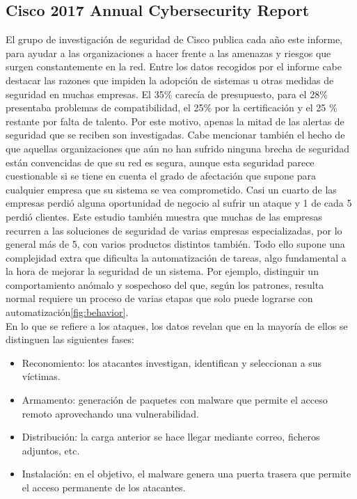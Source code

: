 \subsection{Cisco 2017 Annual Cybersecurity Report}
El grupo de investigación de seguridad de Cisco publica cada año este informe, para ayudar a las organizaciones a hacer frente a las amenazas y riesgos que surgen constantemente en la red. Entre los datos recogidos por el informe cabe destacar las razones que impiden la adopción de sistemas u otras medidas de seguridad en muchas empresas. El 35\% carecía de presupuesto, para el 28\% presentaba problemas de compatibilidad, el 25\% por la certificación y el 25 \% restante por falta de talento. Por este motivo, apenas la mitad de las alertas de seguridad que se reciben son investigadas. Cabe mencionar también el hecho de que aquellas organizaciones que aún no han sufrido ninguna brecha de seguridad están convencidas de que su red es segura, aunque esta seguridad parece cuestionable si se tiene en cuenta el grado de afectación que supone para cualquier empresa que su sistema se vea comprometido. Casi un cuarto de las empresas perdió alguna oportunidad de negocio al sufrir un ataque y 1 de cada 5 perdió clientes. Este estudio también muestra que muchas de las empresas recurren a las soluciones de seguridad de varias empresas especializadas, por lo general más de 5, con varios productos distintos también. Todo ello supone una complejidad extra que dificulta la automatización de tareas, algo fundamental a la hora de mejorar la seguridad de un sistema. Por ejemplo, distinguir un comportamiento anómalo y sospechoso del que, según los patrones, resulta normal requiere un proceso de varias etapas que solo puede lograrse con automatización\ref{fig:behavior}.\\
En lo que se refiere a los ataques, los datos revelan que en la mayoría de ellos se distinguen las siguientes fases:
\begin{itemize}
	\item Reconomiento: los atacantes investigan, identifican y seleccionan a sus víctimas.
	\item Armamento: generación de paquetes con malware que permite el acceso remoto aprovechando una vulnerabilidad.
	\item Distribución: la carga anterior se hace llegar mediante correo, ficheros adjuntos, etc.
	\item Instalación: en el objetivo, el malware genera una puerta trasera que permite el acceso permanente de los atacantes.
\end{itemize}

